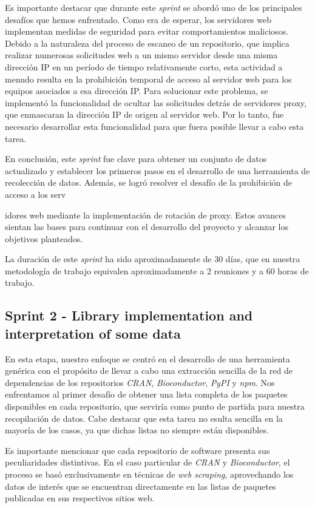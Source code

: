 Es importante destacar que durante este \textit{sprint} se abordó uno de los principales desafíos que hemos enfrentado. 
Como era de esperar, los servidores web implementan medidas de seguridad para evitar comportamientos maliciosos. Debido 
a la naturaleza del proceso de escaneo de un repositorio, que implica realizar numerosas solicitudes web a un mismo servidor 
desde una misma dirección IP en un período de tiempo relativamente corto, esta actividad a menudo resulta en la prohibición temporal de acceso al servidor web para los equipos asociados a esa dirección IP. Para solucionar este problema, se implementó la funcionalidad de ocultar las solicitudes detrás de servidores proxy, que enmascaran la dirección IP de origen al servidor web. Por lo tanto, fue necesario desarrollar esta funcionalidad para que fuera posible llevar a cabo esta tarea.

En conclusión, este \textit{sprint} fue clave para obtener un conjunto de datos actualizado y establecer los primeros 
pasos en el desarrollo de una herramienta de recolección de datos. Además, se logró resolver el desafío de la prohibición 
de acceso a los serv

idores web mediante la implementación de rotación de proxy. Estos avances sientan las bases para continuar con el desarrollo 
del proyecto y alcanzar los objetivos planteados.

La duración de este \textit{sprint} ha sido aproximadamente de 30 días, que en nuestra metodología de trabajo equivalen 
aproximadamente a 2 reuniones y a 60 horas de trabajo.

\subsection{Sprint 2 - Library implementation and interpretation of some data}

En esta etapa, nuestro enfoque se centró en el desarrollo de una herramienta genérica con el propósito de llevar a cabo 
una extracción sencilla de la red de dependencias de los repositorios \textit{CRAN}, \textit{Bioconductor}, \textit{PyPI} 
y \textit{npm}. Nos enfrentamos al primer desafío de obtener una lista completa de los paquetes disponibles en cada 
repositorio, que serviría como punto de partida para nuestra recopilación de datos. Cabe destacar que esta tarea no 
esulta sencilla en la mayoría de los casos, ya que dichas listas no siempre están disponibles.

Es importante mencionar que cada repositorio de software presenta sus peculiaridades distintivas. En el caso particular 
de \textit{CRAN} y \textit{Bioconductor}, el proceso se basó exclusivamente en técnicas de \textit{web scraping}, 
aprovechando los datos de interés que se encuentran directamente en las listas de paquetes publicadas en sus respectivos 
sitios web.

